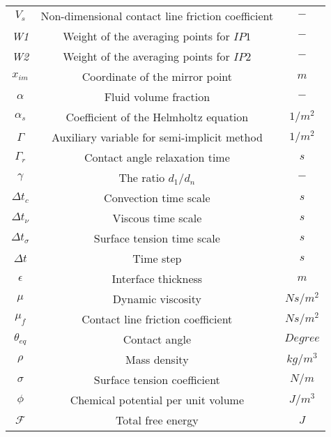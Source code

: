 \documentclass[review]{elsarticle}
\begin{document}
\begin{center}
\begin{longtable}{ c  c c }
\it{$V_s$}&Non-dimensional contact line friction coefficient&$-$\\      
\it{W1}&Weight of the averaging points for $IP1$&$-$\\   
\it{W2}&Weight of the averaging points for $IP2$&$-$\\   
\it{$x_{im}$}&Coordinate of the mirror point&$m$\\  
\it{$\alpha$}&Fluid volume fraction&$-$\\ 
\it{$\alpha_s$}&Coefficient of the Helmholtz equation&$1/m^2$\\ 
\it{$\Gamma$}&Auxiliary variable for semi-implicit method&$1/m^2$\\ 
\it{$\Gamma_r$}&Contact angle relaxation time&$s$\\    
\it{$\gamma$}&The ratio $d_1/d_n$&$-$\\   
\it{$\Delta t_c$}&Convection time scale&$s$\\ 
\it{$\Delta t_{\nu}$}&Viscous time scale&$s$\\    
\it{$\Delta t_{\sigma}$}&Surface tension time scale&$s$\\   
\it{$\Delta t$}&Time step&$s$\\  
\it{$\epsilon$}&Interface thickness& $m$\\ 
\it{$\mu$}&Dynamic viscosity&$Ns/m^2$\\
\it{${\mu}_f$}&Contact line friction coefficient&$Ns/m^2$\\  
\it{$\theta_{eq}$}&Contact angle&$Degree$\\  
\it{$\rho$}&Mass density&$kg/m^3$\\
\it{$\sigma$}&Surface tension coefficient&$N/m$\\
\it{$\phi$}&Chemical potential per unit volume&$J/m^3$\\
\it{$ \mathscr{F}$}&Total free energy&$J$\\ 
 \end{longtable}
\end{center}
\end{document}
